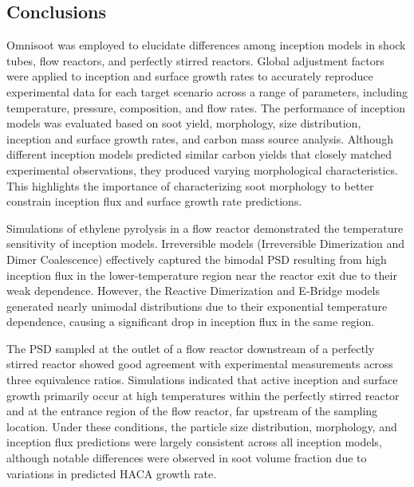 \subsection{Conclusions}

Omnisoot was employed to elucidate differences among inception models in shock tubes, flow reactors, and perfectly stirred reactors. Global adjustment factors were applied to inception and surface growth rates to accurately reproduce experimental data for each target scenario across a range of parameters, including temperature, pressure, composition, and flow rates. The performance of inception models was evaluated based on soot yield, morphology, size distribution, inception and surface growth rates, and carbon mass source analysis. Although different inception models predicted similar carbon yields that closely matched experimental observations, they produced varying morphological characteristics. This highlights the importance of characterizing soot morphology to better constrain inception flux and surface growth rate predictions.

Simulations of ethylene pyrolysis in a flow reactor demonstrated the temperature sensitivity of inception models. Irreversible models (Irreversible Dimerization and Dimer Coalescence) effectively captured the bimodal PSD resulting from high inception flux in the lower-temperature region near the reactor exit due to their weak dependence. However, the Reactive Dimerization and E-Bridge models generated nearly unimodal distributions due to their exponential temperature dependence, causing a significant drop in inception flux in the same region.

The PSD sampled at the outlet of a flow reactor downstream of a perfectly stirred reactor showed good agreement with experimental measurements across three equivalence ratios. Simulations indicated that active inception and surface growth primarily occur at high temperatures within the perfectly stirred reactor and at the entrance region of the flow reactor, far upstream of the sampling location. Under these conditions, the particle size distribution, morphology, and inception flux predictions were largely consistent across all inception models, although notable differences were observed in soot volume fraction due to variations in predicted HACA growth rate.